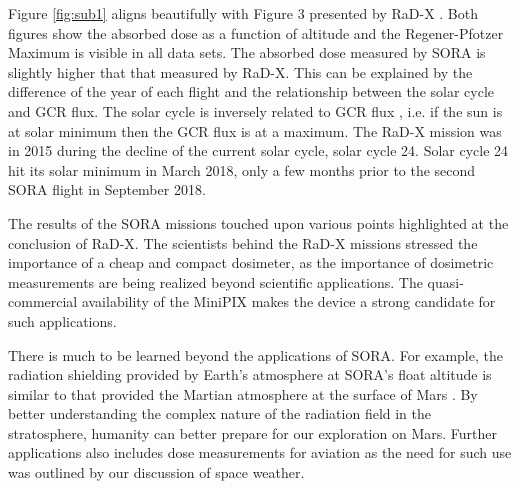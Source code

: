 Figure \ref{fig:sub1} aligns beautifully with Figure 3 presented by RaD-X \cite{rad-x}. Both figures show the absorbed dose as a function of altitude and the Regener-Pfotzer Maximum is visible in all data sets. The absorbed dose measured by SORA is slightly higher that that measured by RaD-X. This can be explained by the difference of the year of each flight and the relationship between the solar cycle and GCR flux. The solar cycle is inversely related to GCR flux \cite{hathaway}, i.e. if the sun is at solar minimum then the GCR flux is at a maximum. The RaD-X mission was in 2015 during the decline of the current solar cycle, solar cycle \num{24}. Solar cycle \num{24} hit its solar minimum in March 2018, only a few months prior to the second SORA flight in September 2018. 

The results of the SORA missions touched upon various points highlighted at the conclusion of RaD-X. The scientists behind the RaD-X missions stressed the importance of a cheap and compact dosimeter, as the importance of dosimetric measurements are being realized beyond scientific applications. The quasi-commercial availability of the MiniPIX makes the device a strong candidate for such applications.

There is much to be learned beyond the applications of SORA. For example, the radiation shielding provided by Earth's atmosphere at SORA's float altitude is similar to that provided the Martian atmosphere at the surface of Mars \cite{rad-x}. By better understanding the complex nature of the radiation field in the stratosphere, humanity can better prepare for our exploration on Mars. Further applications also includes dose measurements for aviation as the need for such use was outlined by our discussion of space weather.



